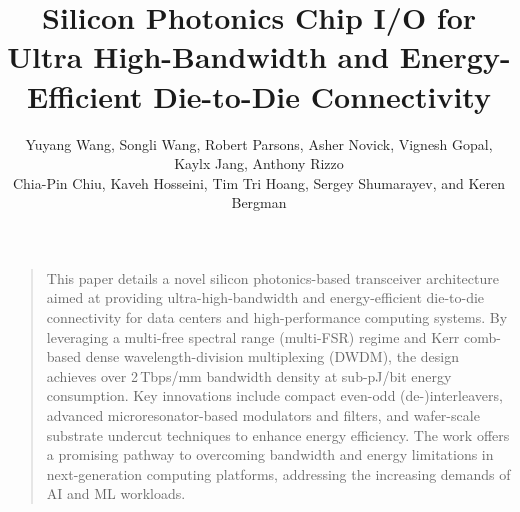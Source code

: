 



\usepackage{pdfpages} %

\pretitle{\begin{center}\LARGE}
\posttitle{\end{center}\vspace{-1.0em}}
\predate{}
\postdate{}

\title{Silicon Photonics Chip I/O for Ultra High-Bandwidth and Energy-Efficient Die-to-Die Connectivity}
\author{Yuyang Wang, Songli Wang, Robert Parsons, Asher Novick, Vignesh Gopal, Kaylx Jang, Anthony Rizzo\\Chia-Pin Chiu, Kaveh Hosseini, Tim Tri Hoang, Sergey Shumarayev, and Keren Bergman}
\date{}

\fancyfoot[L]{\scshape \MakeLowercase{\myName{}}}




\maketitle%
\thispagestyle{fancy}

\begin{quote}
    \large
    This paper details a novel silicon photonics-based transceiver architecture aimed at providing ultra-high-bandwidth and energy-efficient die-to-die connectivity for data centers and high-performance computing systems. By leveraging a multi-free spectral range (multi-FSR) regime and Kerr comb-based dense wavelength-division multiplexing (DWDM), the design achieves over 2\,Tbps/mm bandwidth density at sub-pJ/bit energy consumption. Key innovations include compact even-odd (de-)interleavers, advanced microresonator-based modulators and filters, and wafer-scale substrate undercut techniques to enhance energy efficiency. The work offers a promising pathway to overcoming bandwidth and energy limitations in next-generation computing platforms, addressing the increasing demands of AI and ML workloads.
\end{quote}



